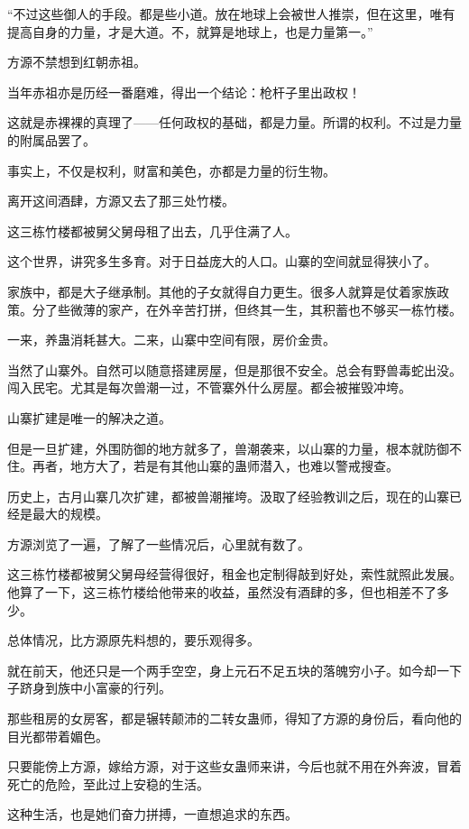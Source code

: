 \begin{this_body}
“不过这些御人的手段。都是些小道。放在地球上会被世人推崇，但在这里，唯有提高自身的力量，才是大道。不，就算是地球上，也是力量第一。”

方源不禁想到红朝赤祖。

当年赤祖亦是历经一番磨难，得出一个结论：枪杆子里出政权！

这就是赤裸裸的真理了——任何政权的基础，都是力量。所谓的权利。不过是力量的附属品罢了。

事实上，不仅是权利，财富和美色，亦都是力量的衍生物。

离开这间酒肆，方源又去了那三处竹楼。

这三栋竹楼都被舅父舅母租了出去，几乎住满了人。

这个世界，讲究多生多育。对于日益庞大的人口。山寨的空间就显得狭小了。

家族中，都是大子继承制。其他的子女就得自力更生。很多人就算是仗着家族政策。分了些微薄的家产，在外辛苦打拼，但终其一生，其积蓄也不够买一栋竹楼。

一来，养蛊消耗甚大。二来，山寨中空间有限，房价金贵。

当然了山寨外。自然可以随意搭建房屋，但是那很不安全。总会有野兽毒蛇出没。闯入民宅。尤其是每次兽潮一过，不管寨外什么房屋。都会被摧毁冲垮。

山寨扩建是唯一的解决之道。

但是一旦扩建，外围防御的地方就多了，兽潮袭来，以山寨的力量，根本就防御不住。再者，地方大了，若是有其他山寨的蛊师潜入，也难以警戒搜查。

历史上，古月山寨几次扩建，都被兽潮摧垮。汲取了经验教训之后，现在的山寨已经是最大的规模。

方源浏览了一遍，了解了一些情况后，心里就有数了。

这三栋竹楼都被舅父舅母经营得很好，租金也定制得敲到好处，索性就照此发展。他算了一下，这三栋竹楼给他带来的收益，虽然没有酒肆的多，但也相差不了多少。

总体情况，比方源原先料想的，要乐观得多。

就在前天，他还只是一个两手空空，身上元石不足五块的落魄穷小子。如今却一下子跻身到族中小富豪的行列。

那些租房的女房客，都是辗转颠沛的二转女蛊师，得知了方源的身份后，看向他的目光都带着媚色。

只要能傍上方源，嫁给方源，对于这些女蛊师来讲，今后也就不用在外奔波，冒着死亡的危险，至此过上安稳的生活。

这种生活，也是她们奋力拼搏，一直想追求的东西。


\end{this_body}
